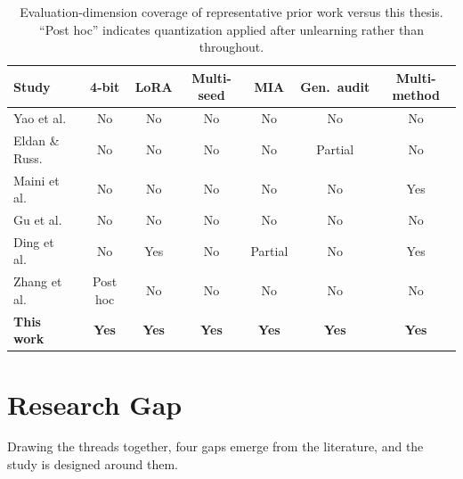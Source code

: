 \documentclass[a4paper,12pt]{report}
\begin{document}
\begin{table}[htbp]
\centering
\caption{Evaluation-dimension coverage of representative prior work versus this thesis. ``Post hoc'' indicates quantization applied after unlearning rather than throughout.}
\label{tab:capability}
\scriptsize
\renewcommand{\arraystretch}{1.25}
\begin{tabular}{p{2.6cm} c c c c c c}
\hline
\textbf{Study} & \textbf{4-bit} & \textbf{LoRA} & \textbf{Multi-seed} & \textbf{MIA} & \textbf{Gen.\ audit} & \textbf{Multi-method} \\
\hline
Yao et al.\ \parencite{yao2023unlearning} & No & No & No & No & No & No \\
Eldan \& Russ.\ \parencite{eldan2023harrypotter} & No & No & No & No & Partial & No \\
Maini et al.\ \parencite{maini2024tofu} & No & No & No & No & No & Yes \\
Gu et al.\ \parencite{gu2024meow} & No & No & No & No & No & No \\
Ding et al.\ \parencite{ding2024peft} & No & Yes & No & Partial & No & Yes \\
Zhang et al.\ \parencite{zhang2024quantization} & Post hoc & No & No & No & No & No \\
\hline
\textbf{This work} & \textbf{Yes} & \textbf{Yes} & \textbf{Yes} & \textbf{Yes} & \textbf{Yes} & \textbf{Yes} \\
\hline
\end{tabular}
\end{table}

\section{Research Gap}
Drawing the threads together, four gaps emerge from the literature, and the study is designed around them.
\end{document}

